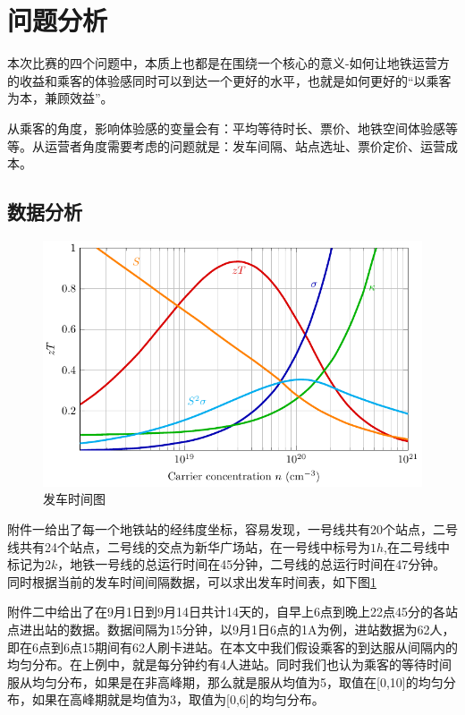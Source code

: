 \documentclass[12pt,a4paper]{mcmthesis}
\begin{document}
    \section{问题分析}

    本次比赛的四个问题中，本质上也都是在围绕一个核心的意义-如何让地铁运营方的收益和乘客的体验感同时可以到达一个更好的水平，也就是如何更好的“以乘客为本，兼顾效益”。

    从乘客的角度，影响体验感的变量会有：平均等待时长、票价、地铁空间体验感等等。从运营者角度需要考虑的问题就是：发车间隔、站点选址、票价定价、运营成本。

    \subsection{数据分析}
    \begin{figure}[h!t]
        \centerline{\includegraphics[scale=0.4]{figures/fig1}\quad
        }
        \caption{\song\wuhao
        发车时间图}
        \label{fig:发车时间图}
    \end{figure}

    附件一给出了每一个地铁站的经纬度坐标，容易发现，一号线共有20个站点，二号线共有24个站点，二号线的交点为新华广场站，在一号线中标号为$1h$,在二号线中标记为$2k$，地铁一号线的总运行时间在45分钟，二号线的总运行时间在47分钟。同时根据当前的发车时间间隔数据，可以求出发车时间表，如下图\ref{fig:发车时间图}

    附件二中给出了在9月1日到9月14日共计14天的，自早上6点到晚上22点45分的各站点进出站的数据。数据间隔为15分钟，以9月1日6点的1A为例，进站数据为62人，即在6点到6点15期间有62人刷卡进站。在本文中我们假设乘客的到达服从间隔内的均匀分布。在上例中，就是每分钟约有4人进站。同时我们也认为乘客的等待时间服从均匀分布，如果是在非高峰期，那么就是服从均值为5，取值在[0,10]的均匀分布，如果在高峰期就是均值为3，取值为[0,6]的均匀分布。
\end{document}
